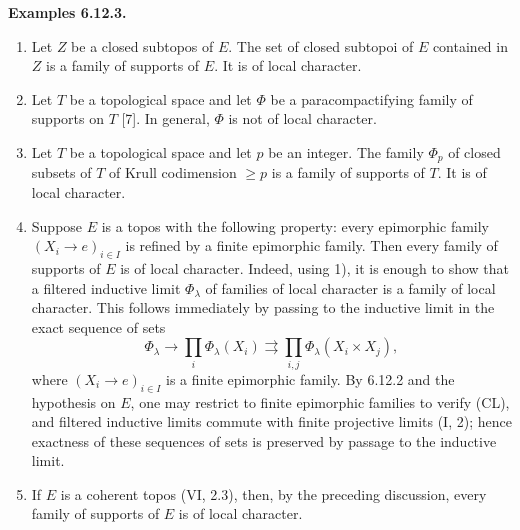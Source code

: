 \documentclass[11pt]{article}
\newenvironment{remarktext}[1]{\par\medskip\noindent\textbf{#1.}\ }{\par\medskip}
\begin{document}
\begin{remarktext}{Examples 6.12.3}
\begin{enumerate}[label=\arabic*)]
\item Let $Z$ be a closed subtopos of $E$. The set of closed subtopoi of $E$ contained in $Z$ is a family of supports of $E$. It is of local character.
\item Let $T$ be a topological space and let $\Phi$ be a paracompactifying family of supports on $T$ [7]. In general, $\Phi$ is not of local character.
\item Let $T$ be a topological space and let $p$ be an integer. The family $\Phi_p$ of closed subsets of $T$ of Krull codimension $\geq p$ is a family of supports of $T$. It is of local character.
\item Suppose $E$ is a topos with the following property: every epimorphic family $(X_i\to e)_{i\in I}$ is refined by a finite epimorphic family. Then every family of supports of $E$ is of local character. Indeed, using 1), it is enough to show that a filtered inductive limit $\Phi_\lambda$ of families of local character is a family of local character. This follows immediately by passing to the inductive limit in the exact sequence of sets
\[
\Phi_\lambda\to \prod_i\Phi_\lambda(X_i)\rightrightarrows \prod_{i,j}\Phi_\lambda(X_i\times X_j),
\]
where $(X_i\to e)_{i\in I}$ is a finite epimorphic family. By 6.12.2 and the hypothesis on $E$, one may restrict to finite epimorphic families to verify (CL), and filtered inductive limits commute with finite projective limits (I, 2); hence exactness of these sequences of sets is preserved by passage to the inductive limit.
\item If $E$ is a coherent topos (VI, 2.3), then, by the preceding discussion, every family of supports of $E$ is of local character.
\end{enumerate}
\end{remarktext}
\end{document}
